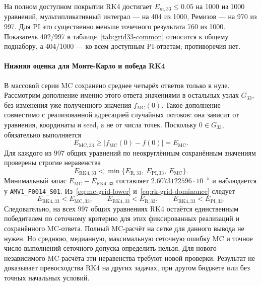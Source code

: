 \documentclass[14pt,a4paper]{extarticle}
\begin{document}
На полном доступном покрытии RK4 достигает $E_{m,33}\le0.05$
на 1000 из 1000 уравнений, мультипликативный интеграл --- на 404
из 1000, Ремизов --- на 970 из 997. Для PI это существенно меньше
точечного результата 760 из 1000. Показатель 402/997
в таблице~\ref{tab:grid33-common} относится к общему поднабору,
а 404/1000 --- ко всем доступным PI-ответам; противоречия нет.

\paragraph{Нижняя оценка для Монте-Карло и победа RK4\\}
В массовой серии MC сохранено среднее четырёх ответов только в нуле.
Рассмотрим дополнение именно этого ответа значениями в остальных
узлах $G_{33}$, без изменения уже полученного значения $f_{\mathrm{MC}}(0)$.
Такое дополнение совместимо с реализованной адресацией случайных
потоков: она зависит от уравнения, координаты и seed, а не от числа
точек. Поскольку $0\in G_{33}$, обязательно выполняется
\begin{equation}\label{eq:mc-grid-lower}
E_{\mathrm{MC},33}\ge
|f_{\mathrm{MC}}(0)-f(0)|=E_{\mathrm{MC}}.
\end{equation}
Для каждого из 997 общих уравнений по неокруглённым сохранённым
значениям проверены строгие неравенства
\begin{equation}\label{eq:rk-grid-dominance}
E_{\mathrm{RK4},33}<
\min\{E_{\mathrm{R},33},\ E_{\mathrm{PI},33},\ E_{\mathrm{MC}}\}.
\end{equation}
Минимальный запас $E_{\mathrm{MC}}-E_{\mathrm{RK4},33}$ составляет
$2.6073122596\cdot10^{-5}$ и наблюдается у
\texttt{AMV1\_F0014\_S01}. Из~\eqref{eq:mc-grid-lower}
и~\eqref{eq:rk-grid-dominance} следует
\[
E_{\mathrm{RK4},33}<E_{\mathrm{MC},33},\qquad
E_{\mathrm{RK4},33}<E_{\mathrm{R},33},\qquad
E_{\mathrm{RK4},33}<E_{\mathrm{PI},33}.
\]
Следовательно, на всех 997 общих уравнениях RK4 остаётся единственным
победителем по сеточному критерию для этих фиксированных реализаций
и сохранённого MC-ответа. Полный MC-расчёт на сетке для данного
вывода не нужен. Но среднюю, медианную, максимальную сеточную ошибку
MC и точное число выполнений сеточного допуска определить нельзя.
Для нового независимого MC-расчёта эти неравенства требуют новой
проверки. Результат не доказывает превосходства RK4 на других задачах,
при другом бюджете или без точных начальных условий.
\end{document}
